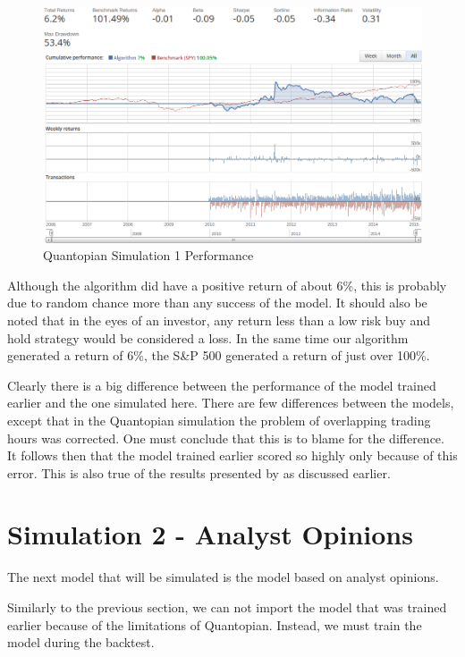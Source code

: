\documentclass{report}
\begin{document}
\begin{figure}[H]
	\caption{Quantopian Simulation 1 Performance}
	\vspace{8pt}
	\centerline{\includegraphics[scale=0.4]{vis/quantopian_related.png}}
	
	\label{fig:quantopian-1}
\end{figure}

Although the algorithm did have a positive return of about 6\%, this is probably due to random chance more than any success of the model. It should also be noted that in the eyes of an investor, any return less than a low risk buy and hold strategy would be considered a loss. In the same time our algorithm generated a return of 6\%, the S\&P 500 generated a return of just over 100\%.

Clearly there is a big difference between the performance of the model trained earlier and the one simulated here. There are few differences between the models, except that in the Quantopian simulation the problem of overlapping trading hours was corrected. One must conclude that this is to blame for the difference. It follows then that the model trained earlier scored so highly only because of this error. This is also true of the results presented by \citet{shen2012stock} as discussed earlier.

\section{Simulation 2 - Analyst Opinions}

The next model that will be simulated is the model based on analyst opinions.

Similarly to the previous section, we can not import the model that was trained earlier because of the limitations of Quantopian. Instead, we must train the model during the backtest. 
\end{document}
